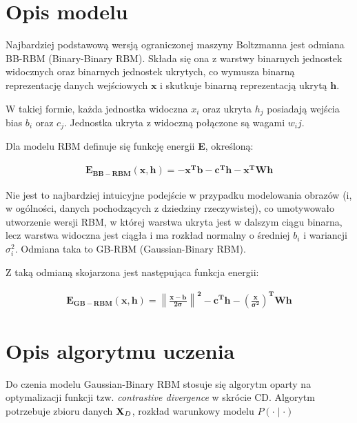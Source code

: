 \documentclass[a4paper,10pt]{report}
\begin{document}
\section{Opis modelu}

Najbardziej podstawową wersją ograniczonej maszyny Boltzmanna jest odmiana BB-RBM (Binary-Binary RBM).
Składa się ona z warstwy binarnych jednostek widocznych oraz binarnych jednostek ukrytych, co wymusza
binarną reprezentację danych wejściowych $\mathbf{x}$ i skutkuje binarną reprezentacją ukrytą
$\mathbf{h}$.

W takiej formie, każda jednostka widoczna $x_i$ oraz ukryta $h_j$ posiadają wejścia bias $b_i$ oraz
$c_j$.
Jednostka ukryta z widoczną połączone są wagami $w_ij$.

Dla modelu RBM definuje się funkcję energii \textbf{E}, określoną:

\begin{align}
	\mathbf{E_{BB-RBM}(x,h) = -x^Tb - c^Th - x^TWh}
\end{align}

Nie jest to najbardziej intuicyjne podejście w przypadku modelowania obrazów (i, w ogólności, danych
pochodzących z dziedziny rzeczywistej), co umotywowało utworzenie wersji RBM, w której warstwa ukryta
jest w dalszym ciągu binarna, lecz warstwa widoczna jest ciągła i ma rozkład normalny o średniej $b_i$ i
wariancji $\sigma^2_i$. Odmiana taka to GB-RBM (Gaussian-Binary RBM).

Z taką odmianą skojarzona jest następująca funkcja energii:

\begin{align}
	\mathbf{E_{GB-RBM}(x,h) = \left\| \frac{x - b}{2 \sigma} \right\| ^2 - c^Th - \left( \frac{x}{\sigma^2} \right) ^TWh}
\end{align}

\section{Opis algorytmu uczenia}

Do czenia modelu Gaussian-Binary RBM stosuje się algorytm oparty na optymalizacji funkcji tzw.
\textit{contrastive divergence} w skrócie CD. Algorytm potrzebuje zbioru danych ${\bf X}_D$, rozkład
warunkowy modelu $P(\cdot\mid\cdot)$ 
\end{document}
